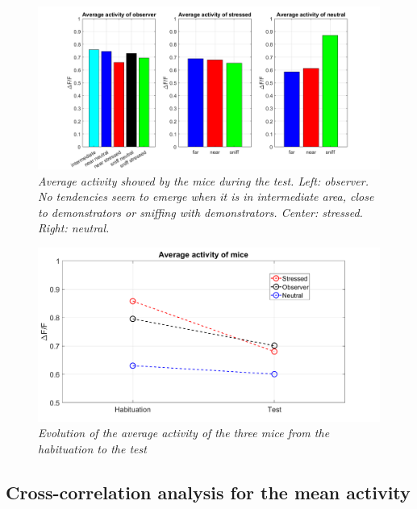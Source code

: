 \documentclass[12pt, a4paper]{article}
\begin{document}
\begin{figure}[H]
	
	\begin{center}
		\hspace*{-1.cm}
		\includegraphics[scale=.35]{activity_barplot.png} 
	\end{center} 
	\caption{\textit{Average activity showed by the mice during the test. Left: observer. No tendencies seem to emerge when it is in intermediate area, close to demonstrators or sniffing with demonstrators. Center: stressed.  Right: neutral.}} \label{activity_barplot}
	
\end{figure}


\begin{figure}[H]
	
	\begin{center}
		
		\includegraphics[scale=.35]{activities.png} 
	\end{center} 
	\caption{\textit{Evolution of the average activity of the three mice from the habituation to the test}}
	\label{activities}
\end{figure}


\subsection{Cross-correlation analysis for the mean activity}
\end{document}
